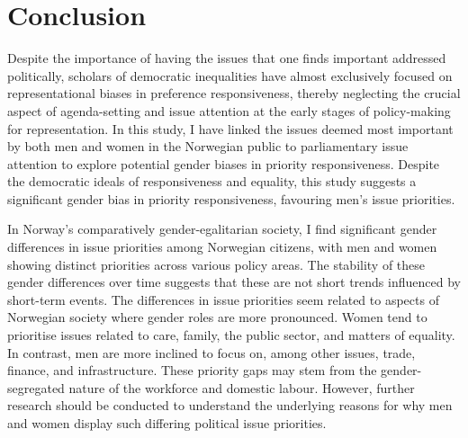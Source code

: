 
\section*{Conclusion}
Despite the importance of having the issues that one finds important addressed politically, scholars of democratic inequalities have almost exclusively focused on representational biases in preference responsiveness, thereby neglecting the crucial aspect of agenda-setting and issue attention at the early stages of policy-making for representation. In this study, I have linked the issues deemed most important by both men and women in the Norwegian public to parliamentary issue attention to explore potential gender biases in priority responsiveness. Despite the democratic ideals of responsiveness and equality, this study suggests a significant gender bias in priority responsiveness, favouring men's issue priorities. 

In Norway's comparatively gender-egalitarian society, I find significant gender differences in issue priorities among Norwegian citizens, with men and women showing distinct priorities across various policy areas. The stability of these gender differences over time suggests that these are not short trends influenced by short-term events. The differences in issue priorities seem related to aspects of Norwegian society where gender roles are more pronounced. Women tend to prioritise issues related to care, family, the public sector, and matters of equality. In contrast, men are more inclined to focus on, among other issues, trade, finance, and infrastructure. These priority gaps may stem from the gender-segregated nature of the workforce and domestic labour. However, further research should be conducted to understand the underlying reasons for why men and women display such differing political issue priorities.

